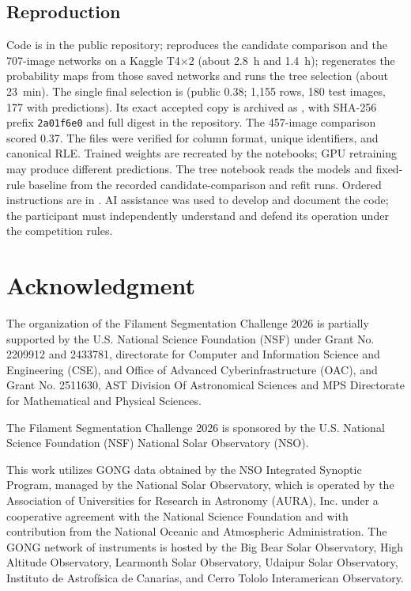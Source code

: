 \documentclass[sigconf]{acmart}
\begin{document}
\subsection{Reproduction}
\sloppy
Code is in the public repository;  reproduces the candidate comparison and  the 707-image networks on a Kaggle T4$\times$2 (about 2.8~h and 1.4~h);  regenerates the probability maps from those saved networks and runs the tree selection (about 23~min). The single final selection is  (public 0.38; 1,155 rows, 180 test images, 177 with predictions). Its exact accepted copy is archived as , with SHA-256 prefix \texttt{2a01f6e0} and full digest in the repository. The 457-image comparison scored 0.37. The files were verified for column format, unique identifiers, and canonical RLE. Trained weights are recreated by the notebooks; GPU retraining may produce different predictions. The tree notebook reads the models and fixed-rule baseline from the recorded candidate-comparison and refit runs. Ordered instructions are in . AI assistance was used to develop and document the code; the participant must independently understand and defend its operation under the competition rules.

\balance
\section{Acknowledgment}\label{sec:acknowledgment}
The organization of the Filament Segmentation Challenge 2026 is partially supported by the U.S. National Science Foundation (NSF) under Grant No. 2209912 and 2433781, directorate for Computer and Information Science and Engineering (CSE), and Office of Advanced Cyberinfrastructure (OAC), and Grant No. 2511630, AST Division Of Astronomical Sciences and MPS Directorate for Mathematical and Physical Sciences.

The Filament Segmentation Challenge 2026 is sponsored by the U.S. National Science Foundation (NSF) National Solar Observatory (NSO).

This work utilizes GONG data obtained by the NSO Integrated Synoptic Program, managed by the National Solar Observatory, which is operated by the Association of Universities for Research in Astronomy (AURA), Inc. under a cooperative agreement with the National Science Foundation and with contribution from the National Oceanic and Atmospheric Administration. The GONG network of instruments is hosted by the Big Bear Solar Observatory, High Altitude Observatory, Learmonth Solar Observatory, Udaipur Solar Observatory, Instituto de Astrofísica de Canarias, and Cerro Tololo Interamerican Observatory.


\end{document}
